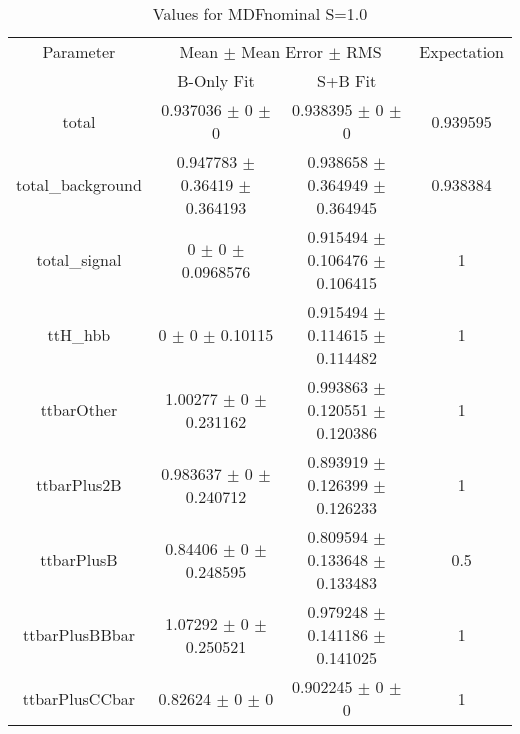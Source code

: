\begin{table}
\centering
\caption{Values for MDFnominal S=1.0}
\begin{tabular}{cccc}
\toprule
Parameter & \multicolumn{2}{c}{Mean $\pm$ Mean Error $\pm$ RMS} & Expectation\\
 & B-Only Fit & S+B Fit & \\
\midrule
total & \num{0.937036} $\pm$ \num{0} $\pm$ \num{0} & \num{0.938395} $\pm$ \num{0} $\pm$ \num{0} & \num{0.939595}\\
total\_background & \num{0.947783} $\pm$ \num{0.36419} $\pm$ \num{0.364193} & \num{0.938658} $\pm$ \num{0.364949} $\pm$ \num{0.364945} & \num{0.938384}\\
total\_signal & \num{0} $\pm$ \num{0} $\pm$ \num{0.0968576} & \num{0.915494} $\pm$ \num{0.106476} $\pm$ \num{0.106415} & \num{1}\\
ttH\_hbb & \num{0} $\pm$ \num{0} $\pm$ \num{0.10115} & \num{0.915494} $\pm$ \num{0.114615} $\pm$ \num{0.114482} & \num{1}\\
ttbarOther & \num{1.00277} $\pm$ \num{0} $\pm$ \num{0.231162} & \num{0.993863} $\pm$ \num{0.120551} $\pm$ \num{0.120386} & \num{1}\\
ttbarPlus2B & \num{0.983637} $\pm$ \num{0} $\pm$ \num{0.240712} & \num{0.893919} $\pm$ \num{0.126399} $\pm$ \num{0.126233} & \num{1}\\
ttbarPlusB & \num{0.84406} $\pm$ \num{0} $\pm$ \num{0.248595} & \num{0.809594} $\pm$ \num{0.133648} $\pm$ \num{0.133483} & \num{0.5}\\
ttbarPlusBBbar & \num{1.07292} $\pm$ \num{0} $\pm$ \num{0.250521} & \num{0.979248} $\pm$ \num{0.141186} $\pm$ \num{0.141025} & \num{1}\\
ttbarPlusCCbar & \num{0.82624} $\pm$ \num{0} $\pm$ \num{0} & \num{0.902245} $\pm$ \num{0} $\pm$ \num{0} & \num{1}\\
\bottomrule
\end{tabular}
\end{table}